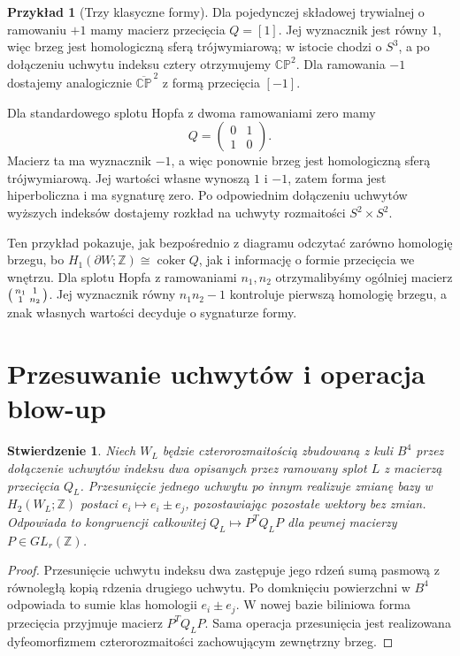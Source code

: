 \documentclass[11pt,a4paper]{report}
\numberwithin{equation}{section}
\theoremstyle{plain}
\newtheorem{stwierdzenie}[twierdzenie]{Stwierdzenie}
\theoremstyle{definition}
\newtheorem{przyklad}[twierdzenie]{Przykład}
\theoremstyle{remark}
\begin{document}
\begin{przyklad}[Trzy klasyczne formy]
Dla pojedynczej składowej trywialnej o ramowaniu $+1$
mamy macierz przecięcia $Q=[1]$. Jej wyznacznik jest równy $1$,
więc brzeg jest homologiczną sferą trójwymiarową; w istocie
chodzi o $S^3$, a po dołączeniu uchwytu indeksu cztery
otrzymujemy $\mathbb{CP}^2$.
Dla ramowania $-1$ dostajemy analogicznie
$\overline{\mathbb{CP}}^{\,2}$ z formą przecięcia $[-1]$.

Dla standardowego splotu Hopfa z dwoma ramowaniami zero mamy
\[
Q=\begin{pmatrix}0&1\\1&0\end{pmatrix}.
\]
Macierz ta ma wyznacznik $-1$, a więc ponownie brzeg jest
homologiczną sferą trójwymiarową. Jej wartości własne wynoszą
$1$ i $-1$, zatem forma jest hiperboliczna i ma sygnaturę zero.
Po odpowiednim dołączeniu uchwytów wyższych indeksów dostajemy
rozkład na uchwyty rozmaitości $S^2\times S^2$.

Ten przykład pokazuje, jak bezpośrednio z diagramu odczytać zarówno
homologię brzegu, bo $H_1(\partial W;\mathbb Z)\cong\operatorname{coker}Q$,
jak i informację o formie przecięcia we wnętrzu. Dla splotu Hopfa
z ramowaniami $n_1,n_2$ otrzymalibyśmy ogólniej macierz
$\begin{psmallmatrix}n_1&1\\1&n_2\end{psmallmatrix}$.
Jej wyznacznik równy $n_1n_2-1$ kontroluje pierwszą homologię brzegu,
a znak własnych wartości decyduje o sygnaturze formy.
\end{przyklad}

\section{Przesuwanie uchwytów i operacja blow-up}
\label{sec:kt-slides}

\begin{stwierdzenie}
Niech $W_L$ będzie czterorozmaitością zbudowaną z kuli
$B^4$ przez dołączenie uchwytów indeksu dwa opisanych
przez ramowany splot $L$ z macierzą przecięcia $Q_L$.
Przesunięcie jednego uchwytu po innym realizuje zmianę
bazy w $H_2(W_L;\mathbb Z)$ postaci
$e_i\mapsto e_i\pm e_j$, pozostawiając pozostałe
wektory bez zmian. Odpowiada to kongruencji całkowitej
$Q_L\mapsto P^TQ_LP$ dla pewnej macierzy
$P\in GL_r(\mathbb Z)$.
\end{stwierdzenie}

\begin{proof}
Przesunięcie uchwytu indeksu dwa zastępuje jego rdzeń
sumą pasmową z równoległą kopią rdzenia drugiego uchwytu.
Po domknięciu powierzchni w $B^4$ odpowiada to sumie
klas homologii $e_i\pm e_j$. W nowej bazie biliniowa
forma przecięcia przyjmuje macierz $P^TQ_LP$.
Sama operacja przesunięcia jest realizowana dyfeomorfizmem
czterorozmaitości zachowującym zewnętrzny brzeg.
\end{proof}
\end{document}
